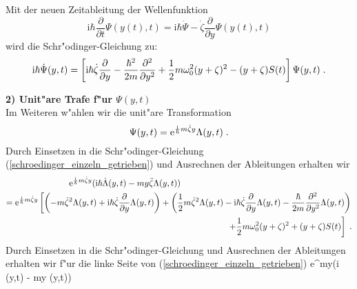     Mit der neuen Zeitableitung der Wellenfunktion
    \begin{equation}
      \text{i}\hbar \frac{\partial}{\partial t} \Psi(y(t),t) = \text{i}\hbar \dot{\Psi} -\dot{\zeta}\frac{\partial}{\partial y}\Psi(y(t),t)
    \end{equation}
    wird die Schr"odinger-Gleichung zu:
    \begin{equation}
      \text i \hbar \dot{\Psi}(y,t) = \left[\text i \hbar \dot{\zeta}\frac{\partial}{\partial y}-\frac{\hbar^2}{2m}\frac{\partial^2}{\partial y^2}+\frac{1}{2}m\omega_0^2(y+\zeta)^2-(y+\zeta)S(t)\right]\Psi(y,t) \; .
      \label{schroedinger_einzeln_getrieben}
    \end{equation}

    \textbf{2) Unit"are Trafe f"ur $\Psi(y,t)$}\\
    Im Weiteren w"ahlen wir die unit"are Transformation
    \begin{equation}
      \Psi(y,t) = \text e^{\frac{\text i}{\hbar}m\dot \zeta y}\Lambda(y,t) \; .
    \end{equation}
    Durch Einsetzen in die Schr"odinger-Gleichung (\ref{schroedinger_einzeln_getrieben}) und Ausrechnen der Ableitungen erhalten wir
    \begin{align}
      \begin{split}
        \text e^{\frac{\text i}{\hbar}m\dot \zeta y}(\text i \hbar \dot \Lambda(y,t) - my \ddot{\zeta}\Lambda(y,t))  \quad\quad \quad \quad \quad \quad \quad \quad \quad \quad\quad\quad\quad\quad \quad \quad \quad\quad\quad\quad\\
         = \text e^{\frac{\text i}{\hbar}m\dot \zeta y} \left[\left(-m\dot \zeta^2 \Lambda(y,t) + \text i \hbar \dot \zeta \frac{\partial}{\partial y} \Lambda(y,t) \right) + \left(\frac{1}{2}m\dot \zeta^2 \Lambda(y,t) - \text{i} \hbar \dot \zeta \frac{\partial}{\partial y} \Lambda(y,t) - \frac{\hbar}{2m}\frac{\partial^2}{\partial y^2} \Lambda(y,t)  \right) \right. \\
        \left. + \frac{1}{2}m\omega_0^2(y+\zeta)^2  + (y+\zeta)S(t)  \right] \; .
      \end{split}
    \end{align}
    \iffalse
    Durch Einsetzen in die Schr"odinger-Gleichung und Ausrechnen der Ableitungen erhalten wir f"ur die linke Seite von (\ref{schroedinger_einzeln_getrieben})
    \text e^{m\dot \zeta y}(\text i \hbar \dot \Lambda(y,t) - my \ddot{\zeta}\Lambda(y,t))
    \begin{equation}
    \end{equation}
